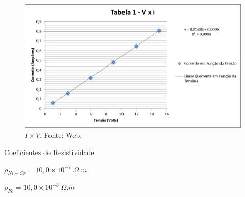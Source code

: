 \begin{figure}[H]
	\centering
	\includegraphics[scale=.4]{img/lei-de-ohm.jpg}
	\caption{$I \times V$. Fonte: Web.}
	\label{fig:imagem1}
\end{figure}

\noindent Coeficientes de Resistividade:

\noindent $\rho_{Ni-Cr} = 10,0 \times 10^{-7}\;\Omega.m$

\noindent $\rho_{Fe} = 10,0 \times 10^{-8}\;\Omega.m$






